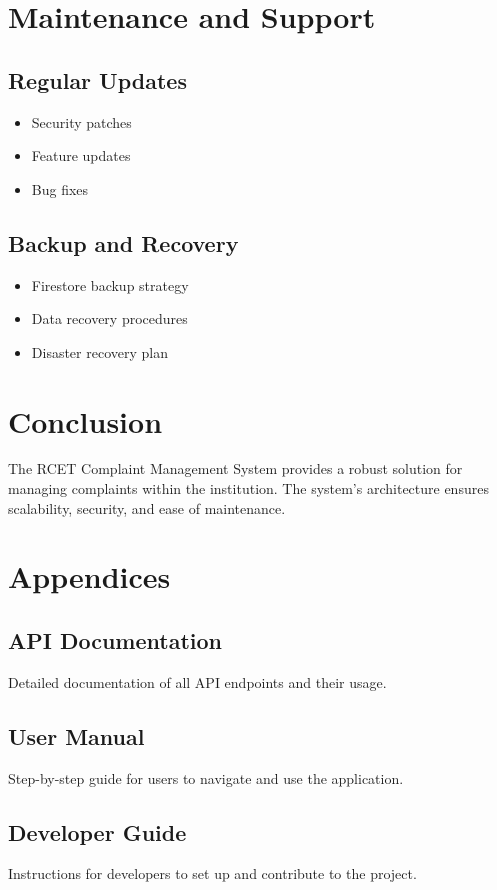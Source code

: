 \documentclass[12pt,a4paper]{article}
\begin{document}
\section{Maintenance and Support}
\subsection{Regular Updates}
\begin{itemize}
    \item Security patches
    \item Feature updates
    \item Bug fixes
\end{itemize}

\subsection{Backup and Recovery}
\begin{itemize}
    \item Firestore backup strategy
    \item Data recovery procedures
    \item Disaster recovery plan
\end{itemize}

\section{Conclusion}
The RCET Complaint Management System provides a robust solution for managing complaints within the institution. The system's architecture ensures scalability, security, and ease of maintenance.

\section{Appendices}
\subsection{API Documentation}
Detailed documentation of all API endpoints and their usage.

\subsection{User Manual}
Step-by-step guide for users to navigate and use the application.

\subsection{Developer Guide}
Instructions for developers to set up and contribute to the project.
\end{document}
